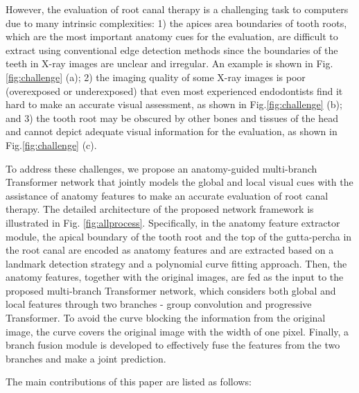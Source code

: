 \documentclass[journal]{IEEEtran}
\begin{document}
However, the evaluation of root canal therapy is a challenging task to computers due to many intrinsic complexities: 1) the apices area boundaries of tooth roots, which are the most important anatomy cues for the evaluation, are difficult to extract using conventional edge detection methods since the boundaries of the teeth in X-ray images are unclear and irregular. An example is shown in \textcolor[rgb]{0,0.541,0.855}{Fig.\ref{fig:challenge} (a)}; 2) the imaging quality of some X-ray images is poor (overexposed or underexposed) that even most experienced endodontists find it hard to make an accurate visual assessment, as shown in \textcolor[rgb]{0,0.541,0.855}{Fig.\ref{fig:challenge} (b)};    
and 3) the tooth root may be obscured by other bones and tissues of the head and cannot depict adequate visual information for the evaluation, as shown in \textcolor[rgb]{0,0.541,0.855}{Fig.\ref{fig:challenge} (c)}. 


To address these challenges, we propose an anatomy-guided multi-branch Transformer network that jointly models the global and local visual cues with the assistance of anatomy features to make an accurate evaluation of root canal therapy. The detailed architecture of the proposed network framework is illustrated in \textcolor[rgb]{0,0.541,0.855}{Fig. \ref{fig:allprocess}}. Specifically, in the anatomy feature extractor module, the apical boundary of the tooth root and the top of the gutta-percha in the root canal are encoded as anatomy features and are extracted based on a landmark detection strategy and a polynomial curve fitting approach. Then, the anatomy features, together with the original images, are fed as the input to the proposed multi-branch Transformer network, which considers both global and local features through two branches - group convolution and progressive Transformer. To avoid the curve blocking the information from the original image, the curve covers the original image with the width of one pixel. Finally, a branch fusion module is developed to effectively fuse the features from the two branches and make a joint prediction.

The main contributions of this paper are listed as follows: 
\end{document}
